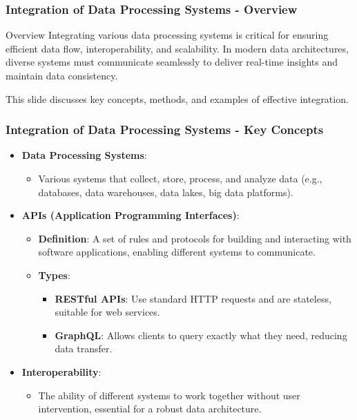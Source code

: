 \documentclass[aspectratio=169]{beamer}
\begin{document}
\begin{frame}[fragile]
    \frametitle{Integration of Data Processing Systems - Overview}
    \begin{block}{Overview}
        Integrating various data processing systems is critical for ensuring efficient data flow, interoperability, and scalability. In modern data architectures, diverse systems must communicate seamlessly to deliver real-time insights and maintain data consistency.
    \end{block}
    This slide discusses key concepts, methods, and examples of effective integration.
\end{frame}

\begin{frame}[fragile]
    \frametitle{Integration of Data Processing Systems - Key Concepts}
    \begin{itemize}
        \item \textbf{Data Processing Systems}:
            \begin{itemize}
                \item Various systems that collect, store, process, and analyze data (e.g., databases, data warehouses, data lakes, big data platforms).
            \end{itemize}
        
        \item \textbf{APIs (Application Programming Interfaces)}:
            \begin{itemize}
                \item \textbf{Definition}: A set of rules and protocols for building and interacting with software applications, enabling different systems to communicate.
                \item \textbf{Types}:
                    \begin{itemize}
                        \item \textbf{RESTful APIs}: Use standard HTTP requests and are stateless, suitable for web services.
                        \item \textbf{GraphQL}: Allows clients to query exactly what they need, reducing data transfer.
                    \end{itemize}
            \end{itemize}
        
        \item \textbf{Interoperability}:
            \begin{itemize}
                \item The ability of different systems to work together without user intervention, essential for a robust data architecture.
            \end{itemize}
    \end{itemize}
\end{frame}
\end{document}
